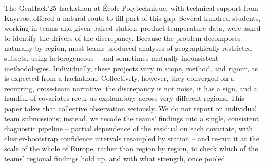 \documentclass[a4paper,12pt,leqno]{article}
\begin{document}
The GenHack'25 hackathon at \'Ecole Polytechnique, with technical support
from Kayrros, offered a natural route to fill part of this gap.
Several hundred students, working in teams and given paired
station--product temperature data, were asked to identify the drivers of
the discrepancy. Because the problem decomposes naturally by region, most
teams produced analyses of geographically restricted subsets, using
heterogeneous -- and sometimes mutually inconsistent -- methodologies.
Individually, these projects vary in scope, method, and rigour, as is
expected from a hackathon. Collectively, however, they converged on a
recurring, cross-team narrative: the discrepancy is not noise, it has a
sign, and a handful of covariates recur as explanatory across very
different regions. This paper takes that collective observation
seriously. We do not report on individual team submissions; instead, we
recode the teams' findings into a single, consistent diagnostic pipeline
-- partial dependence of the residual on each covariate, with
cluster-bootstrap confidence intervals resampled by station -- and re-run
it at the scale of the whole of Europe, rather than region by region, to
check which of the teams' regional findings hold up, and with what
strength, once pooled.
\end{document}
